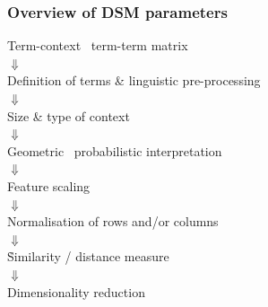 \begin{frame}
  \frametitle{Overview of DSM parameters}

  \ungap[1]
  \begin{center}
    Term-context \vs\ term-term matrix\\
    $\Downarrow$\\
    Definition of terms \& linguistic pre-processing\\
    $\Downarrow$\\
    Size \& type of context\\
    $\Downarrow$\\
    Geometric \vs\ probabilistic interpretation\\
    $\Downarrow$\\
    Feature scaling\\
    $\Downarrow$\\
    Normalisation of rows and/or columns\\
    $\Downarrow$\\
    \h{Similarity / distance measure}\\
    $\Downarrow$\\
    Dimensionality reduction
  \end{center}
\end{frame}

